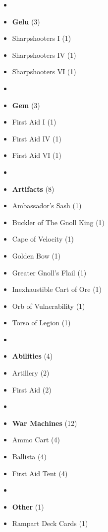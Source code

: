 \begin{multicols*}{3}
\begin{itemize}[leftmargin=0pt, label={}, noitemsep]
  \item
  \item \textbf{Gelu} (3)
  \item Sharpshooters I (1)
  \item Sharpshooters IV (1)
  \item Sharpshooters VI (1)
  \item
  \item \textbf{Gem} (3)
  \item First Aid I (1)
  \item First Aid IV (1)
  \item First Aid VI (1)
  \item
  \item \textbf{Artifacts} (8)
  \item Ambassador's Sash (1)
  \item Buckler of The Gnoll King (1)
  \item Cape of Velocity (1)
  \item Golden Bow (1)
  \item Greater Gnoll's Flail (1)
  \item Inexhaustible Cart of Ore (1)
  \item Orb of Vulnerability (1)
  \item Torso of Legion (1)
  \item
  \item \textbf{Abilities} (4)
  \item Artillery (2)
  \item First Aid (2)
  \item
  \item \textbf{War Machines} (12)
  \item Ammo Cart (4)
  \item Ballista (4)
  \item First Aid Tent (4)
  \item
  \item \textbf{Other} (1)
  \item Rampart Deck Cards (1)
\end{itemize}

\end{multicols*}
